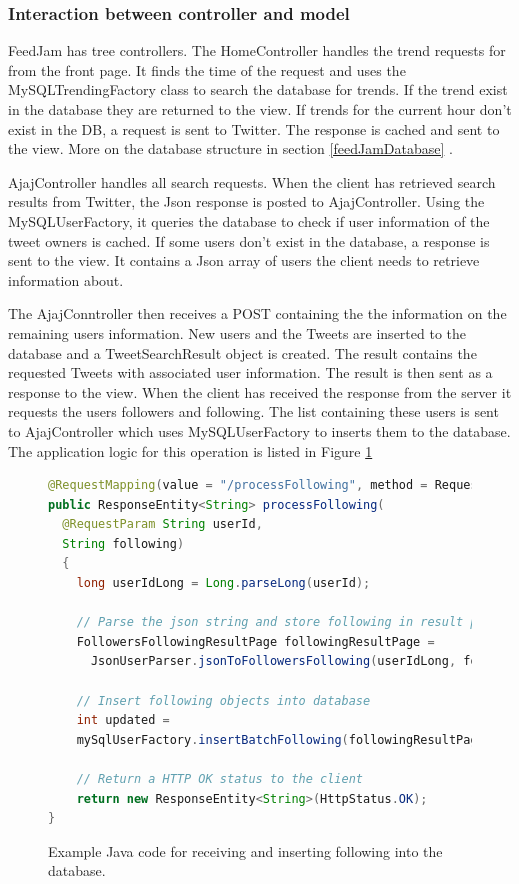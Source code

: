 \subsubsection{Interaction between controller and model} %
FeedJam has tree controllers. The HomeController handles the trend requests for from the front page. It finds the time of the request and uses the MySQLTrendingFactory class to search the database for trends. If the trend exist in the database they are returned to the view. If trends for the current hour don't exist in the DB, a request is sent to Twitter. The response is cached and sent to the view. More on the database structure in section \ref{feedJamDatabase} .

AjajController handles all search requests. When the client has retrieved search results from Twitter, the Json response is posted to AjajController. Using the MySQLUserFactory, it queries the database to check if user information of the tweet owners is cached. If some users don't exist in the database, a response is sent to the view. It contains a Json array of users the client needs to retrieve information about. 

The AjajConntroller then receives a POST containing the the information on the remaining users information. New users and the Tweets are inserted to the database and a TweetSearchResult object is created. The result contains the requested Tweets with associated user information. The result is then sent as a response to the view. When the client has received the response from the server it requests the users followers and following. The list containing these users is sent to AjajController which uses MySQLUserFactory to inserts them to the database. The application logic for this operation is listed in Figure \ref{javaProcessFollowing}

\begin{figure}[h!]
\begin{lstlisting}[language=java]
@RequestMapping(value = "/processFollowing", method = RequestMethod.POST)
public ResponseEntity<String> processFollowing(
  @RequestParam String userId,
  String following) 
  {
    long userIdLong = Long.parseLong(userId);
    
    // Parse the json string and store following in result page object
    FollowersFollowingResultPage followingResultPage = 
      JsonUserParser.jsonToFollowersFollowing(userIdLong, following);
    
    // Insert following objects into database
    int updated = 
    mySqlUserFactory.insertBatchFollowing(followingResultPage);

    // Return a HTTP OK status to the client				
    return new ResponseEntity<String>(HttpStatus.OK);
}
\end{lstlisting}
\caption{Example Java code for receiving and inserting following into the database.}
\label{javaProcessFollowing}
\end{figure}

